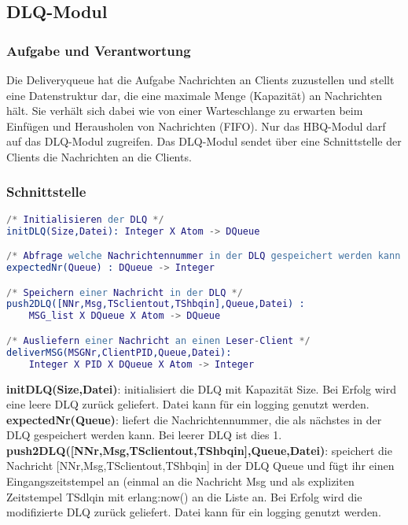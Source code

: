 \documentclass{article}
\begin{document}
\subsection{DLQ-Modul}
\subsubsection{Aufgabe und Verantwortung}
Die Deliveryqueue hat die Aufgabe Nachrichten an Clients zuzustellen und stellt eine Datenstruktur dar, die eine maximale Menge (Kapazität) an Nachrichten hält. Sie verhält sich dabei wie von einer Warteschlange zu erwarten beim Einfügen und Herausholen von Nachrichten (FIFO). Nur das HBQ-Modul darf auf das DLQ-Modul zugreifen. Das DLQ-Modul sendet über eine Schnittstelle der Clients die Nachrichten an die Clients.

\subsubsection{Schnittstelle}
\begin{lstlisting}[language=erlang]
/* Initialisieren der DLQ */
initDLQ(Size,Datei): Integer X Atom -> DQueue

/* Abfrage welche Nachrichtennummer in der DLQ gespeichert werden kann */
expectedNr(Queue) : DQueue -> Integer

/* Speichern einer Nachricht in der DLQ */
push2DLQ([NNr,Msg,TSclientout,TShbqin],Queue,Datei) :
    MSG_list X DQueue X Atom -> DQueue

/* Ausliefern einer Nachricht an einen Leser-Client */
deliverMSG(MSGNr,ClientPID,Queue,Datei):
    Integer X PID X DQueue X Atom -> Integer
\end{lstlisting}

\textbf{initDLQ(Size,Datei)}: initialisiert die DLQ mit Kapazität Size. Bei Erfolg wird eine leere DLQ zurück geliefert. Datei kann für ein logging genutzt werden.\\

\textbf{expectedNr(Queue)}: liefert die Nachrichtennummer, die als nächstes in der DLQ gespeichert werden kann. Bei leerer DLQ ist dies 1.\\

\textbf{push2DLQ([NNr,Msg,TSclientout,TShbqin],Queue,Datei)}: speichert die Nachricht [NNr,Msg,TSclientout,TShbqin] in der DLQ Queue und fügt ihr einen Eingangszeitstempel an (einmal an die Nachricht Msg und als expliziten Zeitstempel TSdlqin mit erlang:now() an die Liste an. Bei Erfolg wird die modifizierte DLQ zurück geliefert. Datei kann für ein logging genutzt werden.\\
\end{document}
